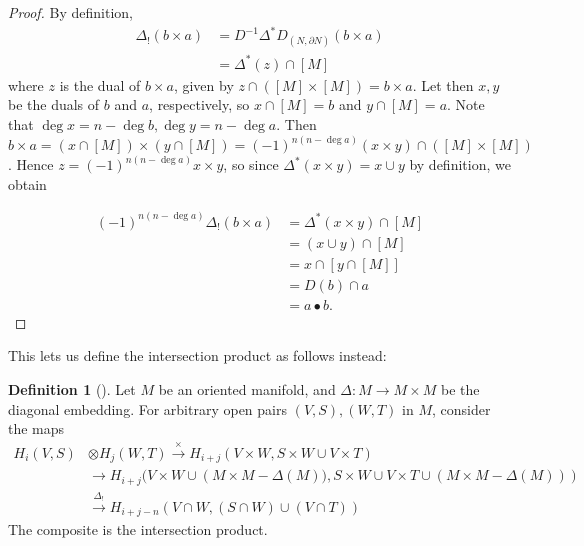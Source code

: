 \documentclass[reqno]{amsart}
\theoremstyle{definition}
\newtheorem{definition}[theorem]{Definition}
\theoremstyle{remark}
\begin{document}
      \begin{proof}
          By definition,
          \begin{align*}
              \Delta_! (b \times a) 
              &= D^{-1} \Delta^{*} D_{\left( N, \partial N \right) }
              \left( b \times a \right) \\
              &= \Delta^{*} (z) \cap \left[ M \right] 
          \end{align*}
          where $z$ is the dual of 
          $b \times a$, given by
          $z \cap \left( \left[ M \right] \times \left[ M \right]  \right) 
          = b \times a$.
          Let then
          $x,y$ be the duals of
          $b$ and $a$, respectively, so
          $x \cap \left[ M \right] = b$ and
          $y \cap \left[ M \right] = a$.
          Note that $\deg x = n - \deg b, \deg y = n - \deg a$.
          Then
          $b \times a = 
          \left( x \cap \left[ M \right]  \right) \times 
          \left( y \cap \left[ M \right]  \right) =
          (-1)^{n (n - \deg a)  }
          \left( x \times y \right) \cap \left( \left[ M \right] \times 
          \left[ M \right] \right) $. Hence
          $z = (-1)^{n (n- \deg a)} x \times y$, so since
          $\Delta^{*}(x \times y) = 
          x \cup y$ by definition, we obtain

          \begin{align*}
              (-1)^{n (n- \deg a)} \Delta_! (b \times a) 
              &= \Delta^{*} (x \times y) \cap \left[ M \right] \\
              &= \left( x \cup y \right) \cap \left[ M \right] \\
              &= x \cap \left[ y \cap \left[ M \right]  \right] \\
              &= D(b) \cap a\\
              &= a \bullet b.
          \end{align*}


      \end{proof}

      This lets us define the intersection product
      as follows instead:

      \begin{definition}[]
      Let $M$ be an oriented manifold, and
      $\Delta \colon M \to M \times M$ be the
      diagonal embedding. For arbitrary open pairs
      $(V,S), (W,T)$ in $M$, consider the maps
      \begin{align*}
          H_i(V,S) 
          &\otimes H_j(W,T) \stackrel{\times }{\to} 
          H_{i+j}(V \times W, S\times W \cup  V \times T)\\
          &\to H_{i+j}(V \times W \cup \left( M \times M - 
          \Delta(M)) , 
      S \times W \cup  V \times T \cup  (M \times M - 
  \Delta(M))\right) \\
          &\stackrel{\Delta_{!}}{\to} 
          H_{i+j-n}\left( V \cap W, \left( S \cap W \right) \cup 
          \left( V \cap T \right) \right) 
      \end{align*}
      The composite is the intersection product.
      \end{definition}
\end{document}
